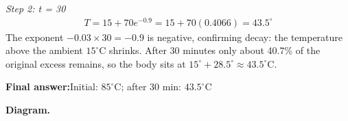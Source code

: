 \documentclass[11pt]{article}
\begin{document}
\textit{Step 2: t = 30}
\[\begin{gathered}
T = 15 + 70e^{-0.9} = 15 + 70(0.4066) = 43.5^\circ
\end{gathered}\]
The exponent \( -0.03 \times 30 = -0.9 \) is negative, confirming decay: the temperature above the ambient \( 15^\circ \)C shrinks. After 30 minutes only about 40.7\% of the original excess remains, so the body sits at \( 15^\circ + 28.5^\circ \approx 43.5^\circ \)C.

\begin{answerbox}
\textbf{Final answer:}\quad Initial: \(\displaystyle 85^\circ\)C; after 30 min: \(\displaystyle 43.5^\circ\)C
\end{answerbox}
\textbf{Diagram.}

\begin{center}
\end{center}
\end{document}
